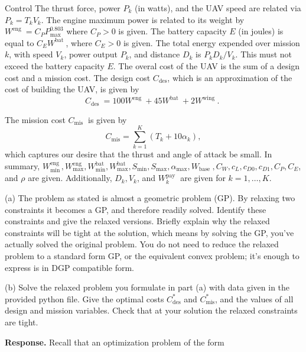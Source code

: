 \begin{chapter}{Control}
    The thrust force, power $P_k$ (in watts), and the UAV speed are related via $P_k=T_k V_k$. The engine maximum power is related to its weight by $W^{\text {eng }}=C_P P_{\max }^{0.803}$ where $C_P>0$ is given.
    The battery capacity $E$ (in joules) is equal to $C_E W^{\text {bat }}$, where $C_E>0$ is given. The total energy expended over mission $k$, with speed $V_k$, power output $P_k$, and distance $D_k$ is $P_k D_k / V_k$. This must not exceed the battery capacity $E$.
    The overal cost of the UAV is the sum of a design cost and a mission cost. The design cost $C_{\mathrm{des}}$, which is an approximation of the cost of building the UAV, is given by
    \[
    C_{\text {des }}=100 W^{\text {eng }}+45 W^{\text {bat }}+2 W^{\text {wing }} \text {. }
    \]

    \noindent The mission cost $C_{\text {mis }}$ is given by
    \[
    C_{\mathrm{mis}}=\sum_{k=1}^K\left(T_k+10 \alpha_k\right),
    \]
    which captures our desire that the thrust and angle of attack be small.
    In summary, $W_{\min }^{\text {eng }}, W_{\max }^{\mathrm{eng}}, W_{\min }^{\mathrm{bat}}, W_{\max }^{\mathrm{bat}}, S_{\min }, S_{\max }, \alpha_{\max }, W_{\text {base }}, C_W, c_L, c_{D 0}, c_{D 1}, C_P, C_E$, and $\rho$ are given. Additionally, $D_k, V_k$, and $W_k^{\text {pay }}$ are given for $k=1, \ldots, K$.
    
    \vspace{0.1cm}
    \noindent(a) The problem as stated is almost a geometric problem (GP). By relaxing two constraints it becomes a GP,
    and therefore readily solved.
    Identify these constraints and give the relaxed versions. Briefly explain why the relaxed constraints will be tight at the solution,
    which means by solving the GP, you've actually solved the original problem.
    You do not need to reduce the relaxed problem to a standard form GP, or the equivalent convex problem; it's enough to express is in DGP compatible form.
    
    \vspace{0.1cm}
    \noindent(b) Solve the relaxed problem you formulate in part (a) with data given in the provided python file.
    Give the optimal costs $C_{\text{des}}^{*}$ and $C_{\text{mis}}^{*}$, and the values of all design and mission variables. 
    Check that at your solution the relaxed constraints are tight.
    
    \vspace{0.1cm}
    \noindent \textbf{Response.}
    Recall that an optimization problem of the form
    

\end{chapter}
